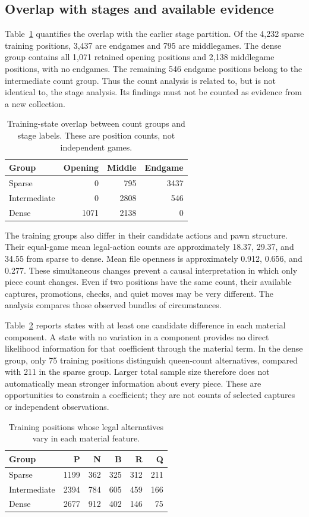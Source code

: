 \documentclass{jcst}
\begin{document}
\subsection{Overlap with stages and available evidence}
Table~\ref{tab:countoverlap} quantifies the overlap with the earlier stage partition. Of the 4,232 sparse training positions, 3,437 are endgames and 795 are middlegames. The dense group contains all 1,071 retained opening positions and 2,138 middlegame positions, with no endgames. The remaining 546 endgame positions belong to the intermediate count group. Thus the count analysis is related to, but is not identical to, the stage analysis. Its findings must not be counted as evidence from a new collection.
\begin{table}[tbp]\centering
\small
\caption{Training-state overlap between count groups and stage labels. These are position counts, not independent games.}\label{tab:countoverlap}
\begin{tabular}{lrrr}
\toprule
Group & Opening & Middle & Endgame\\\midrule
Sparse & 0 & 795 & 3437\\
Intermediate & 0 & 2808 & 546\\
Dense & 1071 & 2138 & 0\\
\bottomrule\end{tabular}\end{table}

The training groups also differ in their candidate actions and pawn structure. Their equal-game mean legal-action counts are approximately 18.37, 29.37, and 34.55 from sparse to dense. Mean file openness is approximately 0.912, 0.656, and 0.277. These simultaneous changes prevent a causal interpretation in which only piece count changes. Even if two positions have the same count, their available captures, promotions, checks, and quiet moves may be very different. The analysis compares those observed bundles of circumstances.

Table~\ref{tab:countsupport} reports states with at least one candidate difference in each material component. A state with no variation in a component provides no direct likelihood information for that coefficient through the material term. In the dense group, only 75 training positions distinguish queen-count alternatives, compared with 211 in the sparse group. Larger total sample size therefore does not automatically mean stronger information about every piece. These are opportunities to constrain a coefficient; they are not counts of selected captures or independent observations.
\begin{table}[tbp]\centering
\small
\caption{Training positions whose legal alternatives vary in each material feature.}\label{tab:countsupport}
\begin{tabular}{lrrrrr}
\toprule
Group & P & N & B & R & Q\\\midrule
Sparse & 1199 & 362 & 325 & 312 & 211\\
Intermediate & 2394 & 784 & 605 & 459 & 166\\
Dense & 2677 & 912 & 402 & 146 & 75\\
\bottomrule\end{tabular}\end{table}
\end{document}
